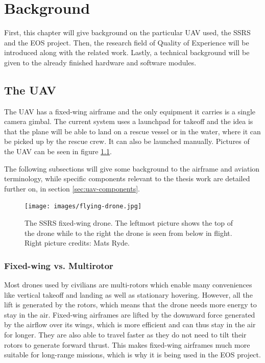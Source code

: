 \documentclass[nofilelist]{cslthse-msc}
\begin{document}
\chapter{Background}
First, this chapter will give background on the particular UAV used, the SSRS and the EOS project. Then, the research field of Quality of Experience will be introduced along with the related work. Lastly, a technical background will be given to the already finished hardware and software modules.  

\section{The UAV}
\label{sec:fixed-wing-uav}
The UAV has a fixed-wing airframe and the only equipment it carries is a single camera gimbal. The current system uses a launchpad for takeoff and the idea is that the plane will be able to land on a rescue vessel or in the water, where it can be picked up by the rescue crew. It can also be launched manually. Pictures of the UAV can be seen in figure \ref{fig:fv-drone-pics}. 

The following subsections will give some background to the airframe and aviation terminology, while specific components relevant to the thesis work are detailed further on, in section \ref{sec:uav-components}.

\begin{figure}[htp]
   \centering
   \texttt{[image: images/flying-drone.jpg]}
   \caption{The SSRS fixed-wing drone. The leftmost picture shows the top of the drone while to the right the drone is seen from below in flight. Right picture credits: Mats Ryde.}
   \label{fig:fv-drone-pics}
\end{figure}

\subsection{Fixed-wing vs. Multirotor}
Most drones used by civilians are multi-rotors which enable many conveniences like vertical takeoff and landing as well as stationary hovering. However, all the lift is generated by the rotors, which means that the drone needs more energy to stay in the air. Fixed-wing airframes are lifted by the downward force generated by the airflow over its wings, which is more efficient and can thus stay in the air for longer. They are also able to travel faster as they do not need to tilt their rotors to generate forward thrust. This makes fixed-wing airframes much more suitable for long-range missions, which is why it is being used in the EOS project.
\end{document}
